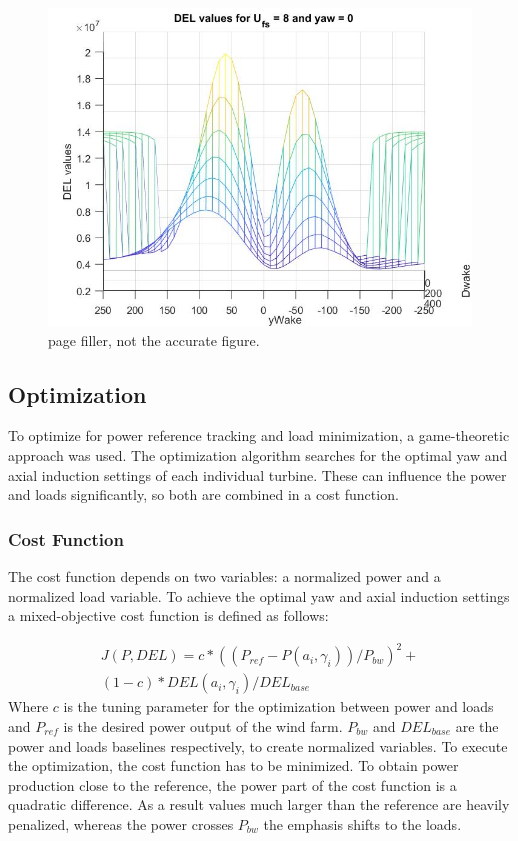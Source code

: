 	\begin{figure}
		\includegraphics[width=\linewidth]{./Figures/pagefiller.jpg}
		\caption{page filler, not the accurate figure.}
		\label{fig:filler}
	\end{figure} 

 
 

\subsection{Optimization}
To optimize for power reference tracking and load minimization, a game-theoretic approach was used.\cite{Marden2013} The optimization algorithm searches for the optimal yaw and axial induction settings of each individual turbine. These can influence the power and loads significantly, so both are combined in a cost function. \cite{Marden2013}\cite{Dijk2016} 

\subsubsection{Cost Function}
The cost function depends on two variables: a normalized power and a normalized load variable. To achieve the optimal yaw and axial induction settings a mixed-objective cost function is defined as follows:

\begin{equation}
\begin{aligned}
J(P,DEL) = c*((P_{ref}-P(a_i,\gamma_i))/P_{bw})^2  + \\
(1-c)*DEL(a_i,\gamma_i)/DEL_{base}
\end{aligned}
 \label{eq:costf}
\end{equation}
Where $c$ is the tuning parameter for the optimization between power and loads and $P_{ref}$ is the desired power output of the wind farm. $P_{bw}$ and $DEL_{base}$ are the power and loads baselines respectively, to create normalized variables.
\newline
To execute the optimization, the cost function has to be minimized. To obtain power production close to the reference, the power part of the cost function is a quadratic difference. As a result values much larger than the reference are heavily penalized, whereas the power crosses $P_{bw}$ the emphasis shifts to the loads.

